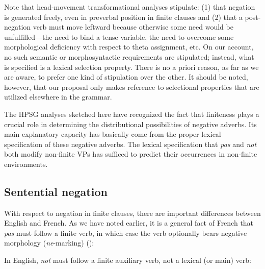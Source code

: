 \documentclass[output=paper
	        ,collection
	        ,collectionchapter
 	        ,biblatex
                ,babelshorthands
                ,newtxmath
                ,draftmode
                ,colorlinks, citecolor=brown
]{langscibook}
\begin{document}
{\begin{exe}
\begin{xlist}
\begin{exe}
\begin{xlist}
\eal
\ex[*]{
\gll Robin  [(ne) pas \jbssub{VP[\textit{fin}]}[aime  Stacy]]. \\
Robin  [(ne) not {\jbssub{VP[\textit{fin}]}[}likes Stacy] \\
}
\zl


Note that head-movement transformational analyses stipulate: (1) that negation
is generated freely, even in preverbal position in finite clauses and (2) that
a post-negation verb must move leftward because otherwise some need would be
unfulfilled---the need to bind a tense variable, the need to overcome some
morphological deficiency with respect to theta assignment, etc. On our
account, no such semantic or morphosyntactic requirements are stipulated;
instead, what is specified is a lexical selection property. There is no a
priori reason, as far as we are aware, to prefer one kind of stipulation over
the other. It should be noted, however, that our proposal only makes reference
to selectional properties that are utilized elsewhere in the grammar.
\fi


The HPSG analyses sketched here have recognized
the fact that finiteness plays a crucial role in
determining the distributional possibilities of negative
adverbs. Its main explanatory capacity
has basically come from the proper lexical specification of these negative
adverbs. The lexical specification that \textit{pas} and
\textit{not} both modify non-finite VPs has sufficed to predict their
occurrences in non-finite environments.



\subsection{Sentential negation}
\label{sec-sentential-negation}

With respect to negation in finite clauses, there are important differences between English and French.
As we have noted earlier, it is a general fact of French that \textit{pas} must follow a finite verb, in which case the verb optionally bears negative morphology (\textit{ne}-marking) (\citealp[]{KS:02}):

\eal
{}
\zl
\noindent
In English, \textit{not} must follow a finite
auxiliary verb, not a lexical (or main) verb:


\end{xlist}
\end{exe}
\end{xlist}
\end{exe}}
\end{document}

